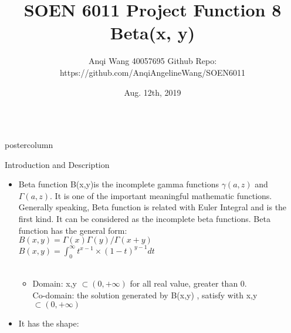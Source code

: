 \documentclass[final,hyperref={pdfpagelabels=false}]{beamer}
\title{\huge SOEN 6011 Project Function 8 Beta(x, y)}
\author{Anqi Wang 40057695 Github Repo: https://github.com/AnqiAngelineWang/SOEN6011}
\institute[Concordia University]{Software Engineering, Concordia University, Montreal, Canada}
\date[Aug. 12th, 2019]{Aug. 12th, 2019}
\newlength{\columnheight}
\begin{document}
\begin{frame}
  \begin{columns}
    \begin{column}{.49\textwidth}
      \begin{beamercolorbox}[center,wd=\textwidth]{postercolumn}
        \begin{minipage}[T]{.95\textwidth}  %
          \parbox[t][\columnheight]{\textwidth}{ %
            
            
            \begin{block}{Introduction and Description}
              \begin{itemize}
              \item Beta function B(x,y)is the incomplete gamma functions $ \gamma (a,z) $ and $\Gamma(a,z)$. It is one of the important meaningful mathematic functions. Generally speaking, Beta function is related with Euler Integral and is the first kind. It can be considered as the incomplete beta functions. Beta function has the general form: \\

 \State $ B (x,y) =  \Gamma(x) \Gamma(y)  / \Gamma( x+y) $ \\
 \State $ B (x,y) =  $$\int_{0}^{\infty} t^{x-1} \times (1-t)^{y-1} dt$$  $ \\ \\

                \begin{itemize}
                \item Domain: x,y $ \subset (0, + \infty)$  for all real value, greater than 0. \\
Co-domain: the solution generated by B(x,y) , satisfy with  x,y $ \subset (0, + \infty)$ 

                \end{itemize}
              \item It has the shape:
                \begin{itemize}
                

\end{itemize}
\end{itemize}
\end{block}}
\end{minipage}
\end{beamercolorbox}
\end{column}
\end{columns}
\end{frame}
\end{document}
